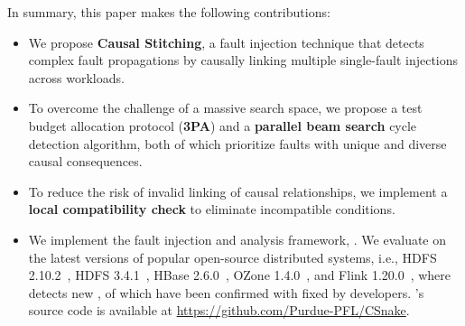 In summary, this paper makes the following contributions:

\begin{itemize}[leftmargin=3ex, noitemsep, topsep=0pt]
\item We propose \textbf{Causal Stitching}, a fault injection technique 
that detects complex fault propagations by causally linking multiple single-fault injections across workloads. 
\item To overcome the challenge of a massive search space, 
we propose a test budget allocation protocol (\textbf{3PA}) and a \textbf{parallel beam search} cycle detection algorithm, both of which prioritize faults with unique and diverse causal consequences. 
\item To reduce the risk of invalid linking of causal relationships, 
we implement a \textbf{local compatibility check} to eliminate incompatible conditions. 
\item We implement the fault injection and analysis framework, \tool. 
We evaluate \tool on the latest versions of \NumOfSysTested popular open-source distributed systems, i.e., HDFS 2.10.2~\cite{apache-hdfs}, HDFS 3.4.1~\cite{apache-hdfs3}, HBase 2.6.0~\cite{apache-hbase}, OZone 1.4.0~\cite{apache-ozone}, and Flink 1.20.0~\cite{apache-flink}, where \tool detects \NumOfNewVC new \vcs, \NumOfConfirmedVC of which have been confirmed with \NumOfFixedVC fixed by developers. 
\tool's source code is available at \url{https://github.com/Purdue-PFL/CSnake}.
\end{itemize}

